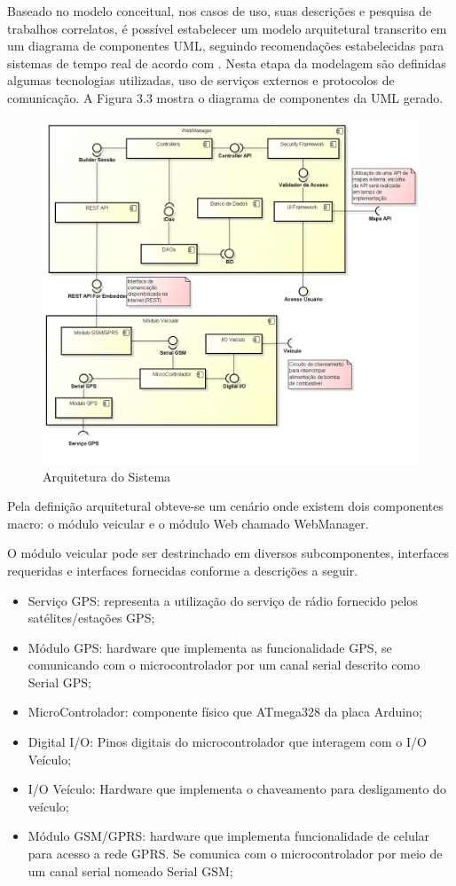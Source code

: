 Baseado no modelo conceitual, nos casos de uso, suas descrições e pesquisa de trabalhos correlatos,
é possível estabelecer um modelo arquitetural transcrito em um diagrama de componentes UML, 
seguindo recomendações estabelecidas para sistemas de tempo real de acordo com \textcite{Mendes:2002}.
Nesta etapa da modelagem são definidas algumas tecnologias utilizadas, uso de serviços externos e protocolos
de comunicação. A Figura 3.3 mostra o diagrama de componentes da UML gerado.

\begin{figure}[!htb]
\centering
\includegraphics[width=\textwidth]{figures/4_arquitetural.png}
\caption{Arquitetura do Sistema}
\label{Figura 3}
\end{figure}


Pela definição arquitetural obteve-se um cenário onde existem dois componentes macro: o módulo veicular e o módulo Web chamado WebManager.

O módulo veicular pode ser destrinchado em diversos subcomponentes, interfaces requeridas e interfaces fornecidas conforme a descrições a seguir.

\begin{itemize}
	\item Serviço GPS: representa a utilização do serviço de rádio fornecido pelos satélites/estações GPS;
	\item Módulo GPS: hardware que implementa as funcionalidade GPS, se comunicando com o microcontrolador por um canal serial descrito como Serial GPS;
	\item MicroControlador: componente físico que ATmega328 da placa Arduino;
	\item Digital I/O: Pinos digitais do microcontrolador que interagem com o I/O Veículo;
	\item I/O Veículo: Hardware que implementa o chaveamento para desligamento do veículo;
	\item Módulo GSM/GPRS: hardware que implementa funcionalidade de celular para acesso a rede GPRS. Se comunica com o microcontrolador por meio de um canal serial nomeado Serial GSM;
\end{itemize}

